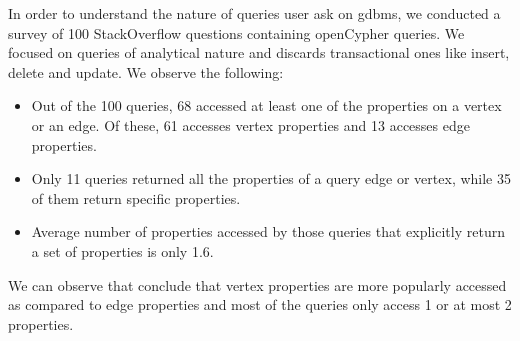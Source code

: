 \begin{guideline}
In order to understand the nature of queries user ask on \gls{gdbms}, we conducted a survey of 100 StackOverflow questions containing openCypher queries. We focused on queries of analytical nature and discards transactional ones like insert, delete and update. We observe the following: 


\begin{itemize}
	
	\item Out of the 100 queries, 68 accessed at least one of the properties on a vertex or an edge. Of these, 61 accesses vertex properties and 13 accesses edge properties.
	
	\item Only 11 queries returned all the properties of a query edge or vertex, while 35 of them return specific properties.
	
	\item Average number of properties accessed by those queries that explicitly return a set of properties is only 1.6.
	
\end{itemize}

We can observe that conclude that vertex properties are more popularly accessed as compared to edge properties and most of the queries only access 1 or at most 2 properties.

\end{guideline}
